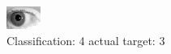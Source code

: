 \begin{figure}[h!]
\begin{center}
\includegraphics[width=0.60\columnwidth]{figures/ID176_class_4_target_3.png}
\end{center}
\caption{ Classification: 4 actual target: 3}
\label{fig:ID176_class_4_target_3}
\end{figure}
